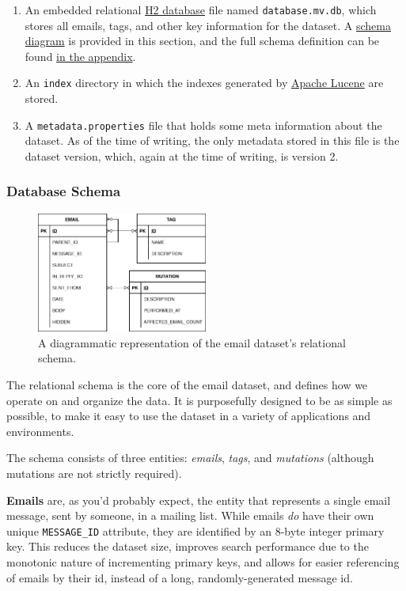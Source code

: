 \documentclass[a4paper, 12pt]{article}
\begin{document}
		\begin{enumerate}
			\item An embedded relational \href{https://www.h2database.com}{H2 database} file named \texttt{database.mv.db}, which stores all emails, tags, and other key information for the dataset. A \hyperref[fig:schema]{schema diagram} is provided in this section, and the full schema definition can be found \hyperref[sec:dataset-schema]{in the appendix}.
			\item An \texttt{index} directory in which the indexes generated by \href{https://lucene.apache.org/}{Apache Lucene} are stored.
			\item A \texttt{metadata.properties} file that holds some meta information about the dataset. As of the time of writing, the only metadata stored in this file is the dataset version, which, again at the time of writing, is version 2.
		\end{enumerate}
	
		\subsubsection{Database Schema}
			\begin{figure}
				\label{fig:schema}
				\includegraphics[width=0.5\textwidth]{img/simple_schema.png}
				\caption{A diagrammatic representation of the email dataset's relational schema.}
			\end{figure}
			The relational schema is the core of the email dataset, and defines how we operate on and organize the data. It is purposefully designed to be as simple as possible, to make it easy to use the dataset in a variety of applications and environments.
			
			The schema consists of three entities: \textit{emails}, \textit{tags}, and \textit{mutations} (although mutations are not strictly required).
			
			\textbf{Emails} are, as you'd probably expect, the entity that represents a single email message, sent by someone, in a mailing list. While emails \textit{do} have their own unique \texttt{MESSAGE\_ID} attribute\cite{rfc5322}, they are identified by an 8-byte integer primary key. This reduces the dataset size, improves search performance due to the monotonic nature of incrementing primary keys, and allows for easier referencing of emails by their id, instead of a long, randomly-generated message id.
			
\end{document}
